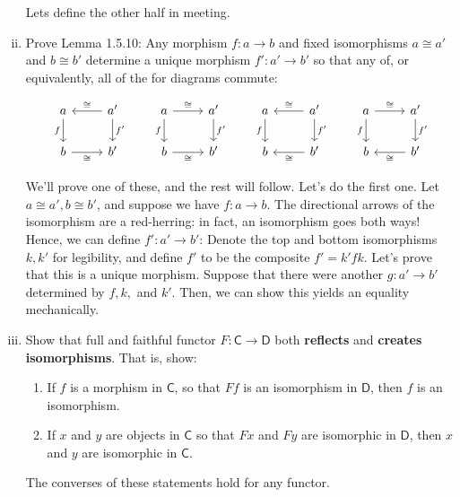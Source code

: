 \documentclass[10pt, oneside]{article}   	%
\newcommand{\cat}[1]{\bm{ \mathsf{#1} }}
\newcommand{\cc}{\cat{C}}
\newcommand{\dd}{\cat{D}}
\begin{document}
\begin{enumerate}[(i)]
Lets define the other half in meeting.


\item Prove Lemma 1.5.10: Any morphism $f : a \to b$ and fixed isomorphisms $a \cong a'$ and $b \cong b'$ determine a unique morphism $f' : a' \to b'$ so that any of, or equivalently, all of the for diagrams commute: 


\[
	\begin{aligned}
		\begin{tikzcd}
			 a \ar[d, "f", swap] & a' \ar[l, "\cong", swap] \ar[d, "f'"] \\
			b \ar[r, "\cong", swap] & b'
		\end{tikzcd}
		\qquad
		\begin{tikzcd}
			a \ar[d, "f", swap] \ar[r, "\cong"] & a' \ar[d, "f'"] \\
			b \ar[r, "\cong", swap] & b'
		\end{tikzcd}
		\qquad
		\begin{tikzcd}
			a \ar[d, "f", swap] & a' \ar[l, "\cong", swap] \ar[d, "f'"] \\
			b & b' \ar[l, "\cong"]
		\end{tikzcd}
		\qquad
		\begin{tikzcd}
			a \ar[d, "f", swap] \ar[r, "\cong"] & a' \ar[d, "f'"] \\
			b  & b' \ar[l, "\cong"]
		\end{tikzcd}
	\end{aligned}
\]

We'll prove one of these, and the rest will follow. Let's do the first one. Let $a \cong a', b \cong b'$, and suppose we have $f : a \to b$. The directional arrows of the isomorphism are a red-herring: in fact, an isomorphism goes both ways! Hence, we can define $f' : a' \to b'$: Denote the top and bottom isomorphisms $k, k'$ for legibility, and define $f'$ to be the composite $f' = k'fk$. Let's prove that this is a unique morphism. Suppose that there were another $g : a' \to b'$ determined by $f, k,$ and $k'$. Then, we can show this yields an equality mechanically.

\item Show that full and faithful functor $F: \cc \to \dd$ both \textbf{reflects} and \textbf{creates isomorphisms}. That is, show: 
	\begin{enumerate}[i]
		\item If $f$ is a morphism in $\cc$, so that $Ff$ is an isomorphism in $\dd$, then $f$ is an isomorphism. 
		\item If $x$ and $y$ are objects in $\cc$ so that $Fx$ and $Fy$ are isomorphic in $\dd$, then $x$ and $y$ are isomorphic in $\cc$.
	\end{enumerate}
	The converses of these statements hold for any functor. 
	

\end{enumerate}
\end{document}
